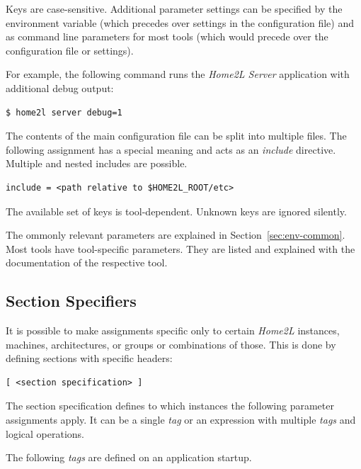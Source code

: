 \documentclass[12pt,english,parskip=half,headheight=19pt]{scrreprt}
\newcommand{\lst}[1]{\colorbox{lstbackground}{\footnotesize\code{#1}}}
\begin{document}
Keys are case-sensitive. Additional parameter settings can be specified
by the \lst{HOME2L_EXTRA} environment variable (which precedes
over settings in the configuration file) and as command line parameters
for most tools (which would precede over the configuration file or
\lst{HOME2L_EXTRA} settings).

For example, the following command runs the
\textit{Home2L Server} application with additional debug output:
\begin{lstlisting}[language=bash]
  $ home2l server debug=1
\end{lstlisting}

The contents of the main configuration file can be split into multiple files.
The following assignment has a special meaning
and acts as an \textit{include} directive. Multiple and nested includes are possible.
\begin{lstlisting}
include = <path relative to $HOME2L_ROOT/etc>
\end{lstlisting}

The available set of keys is tool-dependent. Unknown keys are ignored silently.

The ommonly relevant parameters are explained in Section~\ref{sec:env-common}.
Most tools have tool-specific parameters. They are listed and explained with the
documentation of the respective tool.





\subsection{Section Specifiers}
\label{sec:home2lconf-sectionspec}


It is possible to make assignments specific only to certain \textit{Home2L} instances, machines, architectures, or groups or combinations of those. This is done by defining sections with specific headers:
\begin{lstlisting}
[ <section specification> ]
\end{lstlisting}

The section specification defines to which instances the following parameter assignments apply.
It can be a single \textit{tag} or an expression with multiple \textit{tags} and logical operations.

The following \textit{tags} are defined on an application startup.
\end{document}
